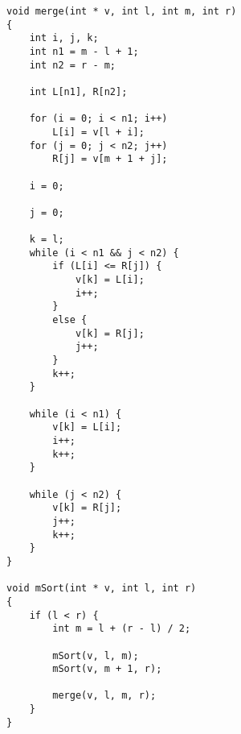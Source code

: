 \begin{lstlisting}[style=CStyle]
void merge(int * v, int l, int m, int r) 
{ 
    int i, j, k; 
    int n1 = m - l + 1; 
    int n2 = r - m; 

    int L[n1], R[n2]; 
    
    for (i = 0; i < n1; i++) 
        L[i] = v[l + i]; 
    for (j = 0; j < n2; j++) 
        R[j] = v[m + 1 + j]; 
    
    i = 0; 
    
    j = 0; 
    
    k = l; 
    while (i < n1 && j < n2) { 
        if (L[i] <= R[j]) { 
            v[k] = L[i]; 
            i++; 
        } 
        else { 
            v[k] = R[j]; 
            j++; 
        } 
        k++; 
    } 
    
    while (i < n1) { 
        v[k] = L[i]; 
        i++; 
        k++; 
    } 
    
    while (j < n2) { 
        v[k] = R[j]; 
        j++; 
        k++; 
    } 
} 

void mSort(int * v, int l, int r) 
{ 
    if (l < r) { 
        int m = l + (r - l) / 2; 
  
        mSort(v, l, m); 
        mSort(v, m + 1, r); 
  
        merge(v, l, m, r); 
    } 
} 
\end{lstlisting}